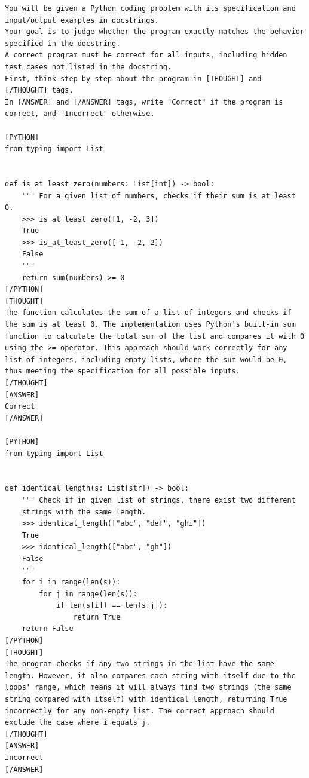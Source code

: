 \begin{lstlisting}[caption={Prompt for correctness checking, CoT (HumanEval)},label={lst:correctness-checking-prompt-cot}, style=boxed]
You will be given a Python coding problem with its specification and input/output examples in docstrings. 
Your goal is to judge whether the program exactly matches the behavior specified in the docstring.
A correct program must be correct for all inputs, including hidden test cases not listed in the docstring.
First, think step by step about the program in [THOUGHT] and [/THOUGHT] tags.
In [ANSWER] and [/ANSWER] tags, write "Correct" if the program is correct, and "Incorrect" otherwise.

[PYTHON]
from typing import List


def is_at_least_zero(numbers: List[int]) -> bool:
    """ For a given list of numbers, checks if their sum is at least 0.
    >>> is_at_least_zero([1, -2, 3])
    True
    >>> is_at_least_zero([-1, -2, 2])
    False
    """
    return sum(numbers) >= 0
[/PYTHON]
[THOUGHT]
The function calculates the sum of a list of integers and checks if the sum is at least 0. The implementation uses Python's built-in sum function to calculate the total sum of the list and compares it with 0 using the >= operator. This approach should work correctly for any list of integers, including empty lists, where the sum would be 0, thus meeting the specification for all possible inputs.
[/THOUGHT]
[ANSWER]
Correct
[/ANSWER]

[PYTHON]
from typing import List


def identical_length(s: List[str]) -> bool:
    """ Check if in given list of strings, there exist two different
    strings with the same length.
    >>> identical_length(["abc", "def", "ghi"])
    True
    >>> identical_length(["abc", "gh"])
    False
    """
    for i in range(len(s)):
        for j in range(len(s)):
            if len(s[i]) == len(s[j]):
                return True
    return False
[/PYTHON]
[THOUGHT]
The program checks if any two strings in the list have the same length. However, it also compares each string with itself due to the loops' range, which means it will always find two strings (the same string compared with itself) with identical length, returning True incorrectly for any non-empty list. The correct approach should exclude the case where i equals j.
[/THOUGHT]
[ANSWER]
Incorrect
[/ANSWER]
\end{lstlisting}

